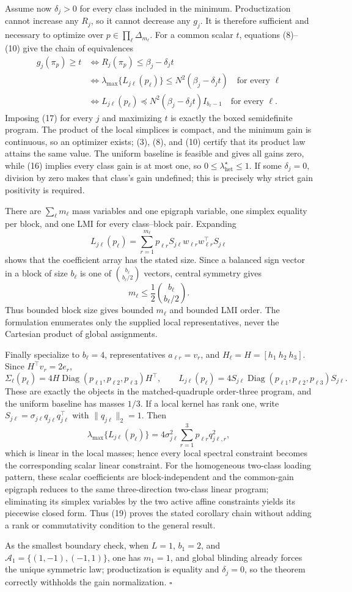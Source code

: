 Assume now \(\delta_j>0\) for every class included in the minimum.  Productization cannot increase any \(R_j\), so it cannot decrease any \(g_j\).  It is therefore sufficient and necessary to optimize over \(p\in\prod_\ell\Delta_{m_\ell}\).  For a common scalar \(t\), equations (8)--(10) give the chain of equivalences
\[
\begin{aligned}
g_j(\pi_p)\ge t
&\iff R_j(\pi_p)\le\beta_j-\delta_jt\\
&\iff \lambda_{\max}\{L_{j\ell}(p_\ell)\}
\le N^2(\beta_j-\delta_jt)\quad\text{for every }\ell\\
&\iff L_{j\ell}(p_\ell)
\preceq N^2(\beta_j-\delta_jt)I_{b_\ell-1}
\quad\text{for every }\ell.
\end{aligned}
\tag{17}
\]
Imposing (17) for every \(j\) and maximizing \(t\) is exactly the boxed semidefinite program.  The product of the local simplices is compact, and the minimum gain is continuous, so an optimizer exists; (3), (8), and (10) certify that its product law attains the same value.  The uniform baseline is feasible and gives all gains zero, while (16) implies every class gain is at most one, so \(0\le\lambda_{\mathrm{het}}^\star\le1\).  If some \(\delta_j=0\), division by zero makes that class's gain undefined; this is precisely why strict gain positivity is required.

There are \(\sum_\ell m_\ell\) mass variables and one epigraph variable, one simplex equality per block, and one LMI for every class--block pair.  Expanding
\[
L_{j\ell}(p_\ell)
=\sum_{r=1}^{m_\ell}p_{\ell r}
S_{j\ell}w_{\ell r}w_{\ell r}^\top S_{j\ell}
\]
shows that the coefficient array has the stated size.  Since a balanced sign vector in a block of size \(b_\ell\) is one of \(\binom{b_\ell}{b_\ell/2}\) vectors, central symmetry gives
\[
m_\ell\le\frac12\binom{b_\ell}{b_\ell/2}.
\tag{18}
\]
Thus bounded block size gives bounded \(m_\ell\) and bounded LMI order.  The formulation enumerates only the supplied local representatives, never the Cartesian product of global assignments.

Finally specialize to \(b_\ell=4\), representatives \(a_{\ell r}=v_r\), and \(H_\ell=H=[h_1\ h_2\ h_3]\).  Since \(H^\top v_r=2e_r\),
\[
\Sigma_\ell(p_\ell)=4H\operatorname{Diag}(p_{\ell1},p_{\ell2},p_{\ell3})H^\top,
\qquad
L_{j\ell}(p_\ell)=4S_{j\ell}\operatorname{Diag}(p_{\ell1},p_{\ell2},p_{\ell3})S_{j\ell}.
\tag{19}
\]
These are exactly the objects in the matched-quadruple order-three program, and the uniform baseline has masses \(1/3\).  If a local kernel has rank one, write \(S_{j\ell}=\sigma_{j\ell}q_{j\ell}q_{j\ell}^\top\) with \(\|q_{j\ell}\|_2=1\).  Then
\[
\lambda_{\max}\{L_{j\ell}(p_\ell)\}
=4\sigma_{j\ell}^2\sum_{r=1}^3p_{\ell r}q_{j\ell,r}^2,
\]
which is linear in the local masses; hence every local spectral constraint becomes the corresponding scalar linear constraint.  For the homogeneous two-class loading pattern, these scalar coefficients are block-independent and the common-gain epigraph reduces to the same three-direction two-class linear program; eliminating its simplex variables by the two active affine constraints yields its piecewise closed form.  Thus (19) proves the stated corollary chain without adding a rank or commutativity condition to the general result.

As the smallest boundary check, when \(L=1\), \(b_1=2\), and \(\mathcal A_1=\{(1,-1),(-1,1)\}\), one has \(m_1=1\), and global blinding already forces the unique symmetric law; productization is equality and \(\delta_j=0\), so the theorem correctly withholds the gain normalization. \(\square\)